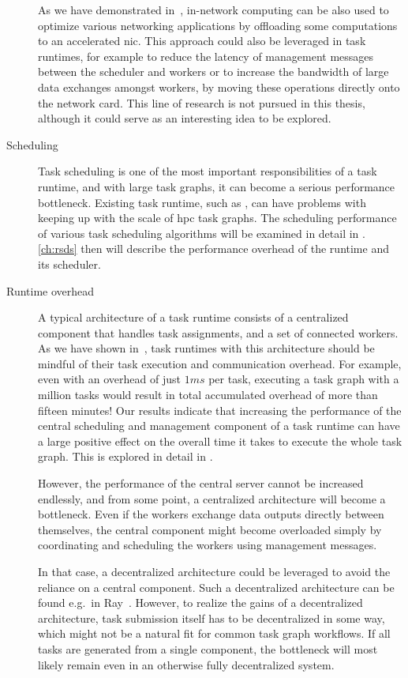 \begin{description}
    As we have demonstrated in~\cite{pspin, spin2}, in-network computing can be also used to
    optimize various networking applications by offloading some computations to an accelerated
    \gls{nic}. This approach could also be leveraged in task runtimes, for example to
    reduce the latency of management messages between the scheduler and workers or to increase the
    bandwidth of large data exchanges amongst workers, by moving these operations directly onto the
    network card. This line of research is not pursued in this thesis, although it could serve as an
    interesting idea to be explored.
    \item[Scheduling] Task scheduling is one of the most important responsibilities of a task runtime, and with large
    task graphs, it can become a serious performance bottleneck. Existing task runtime, such as
    \dask{}, can have problems with keeping up with the scale of
    \gls{hpc} task graphs. The scheduling performance of various task scheduling
    algorithms will be examined in detail in . \autoref{ch:rsds}
    then will describe the performance overhead of the \dask{} runtime and its
    scheduler.
    \item[Runtime overhead] A typical architecture of a task runtime consists of a centralized component that handles task
    assignments, and a set of connected workers. As we have shown in~\cite{rsds}, task
    runtimes with this architecture should be mindful of their task execution and communication
    overhead. For example, even with an overhead of just $1ms$ per task, executing
    a task graph with a million tasks would result in total accumulated overhead of more than fifteen
    minutes! Our results indicate that increasing the performance of the central scheduling and
    management component of a task runtime can have a large positive effect on the overall time it
    takes to execute the whole task graph. This is explored in detail in .

    However, the performance of the central server cannot be increased endlessly, and from some point,
    a centralized architecture will become a bottleneck. Even if the workers exchange data outputs
    directly between themselves, the central component might become overloaded simply by coordinating
    and scheduling the workers using management messages.

    In that case, a decentralized architecture could be leveraged to avoid the reliance on a central
    component. Such a decentralized architecture can be found e.g.\ in Ray~\cite{ray}.
    However, to realize the gains of a decentralized architecture, task submission itself has to be
    decentralized in some way, which might not be a natural fit for common task graph workflows. If all
    tasks are generated from a single component, the bottleneck will most likely remain even in an
    otherwise fully decentralized system.
\end{description}

